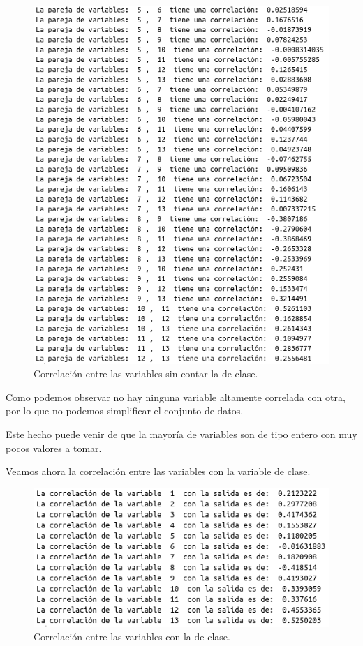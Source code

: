 \documentclass[12pt,a4paper]{article}
\begin{document}
\begin{figure}[H]
	\centering
	\includegraphics[scale=0.7]{./Imagenes/EDA/Clasificacion/correlacion_entre_variables2.png}
	\caption{Correlación entre las variables sin contar la de clase.}
\end{figure}

Como podemos observar no hay ninguna variable altamente correlada con otra, por lo que no podemos simplificar el conjunto de datos.

Este hecho puede venir de que la mayoría de variables son de tipo entero con muy pocos valores a tomar.

Veamos ahora la correlación entre las variables con la variable de clase.

\begin{figure}[H]
	\centering
	\includegraphics[scale=0.7]{./Imagenes/EDA/Clasificacion/correlacion_salida.png}
	\caption{Correlación entre las variables con la de clase.}
\end{figure}
\end{document}
